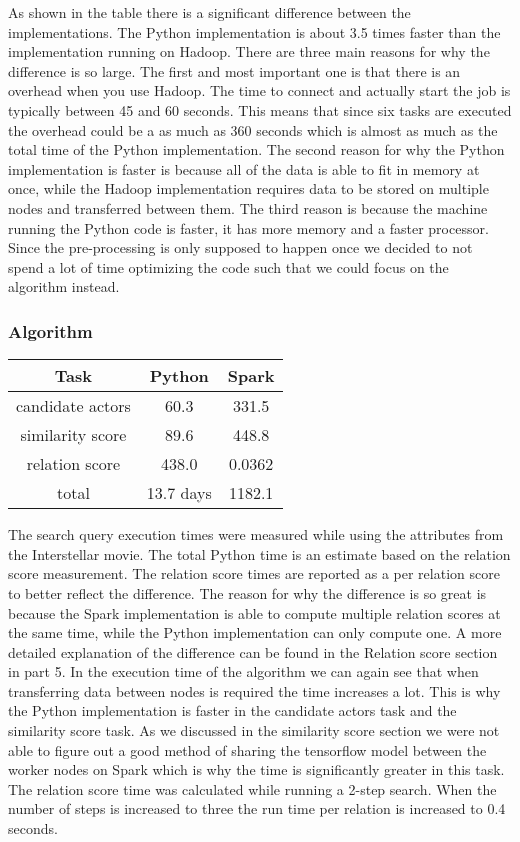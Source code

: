 As shown in the table there is a significant difference between the implementations. The Python implementation is about 3.5 times faster than the implementation running on Hadoop.  There are three main reasons for why the difference is so large. The first and most important one is that there is an overhead when you use Hadoop. The time to connect and actually start the job is typically between 45 and 60 seconds. This means that since six tasks are executed the overhead could be a as much as 360 seconds which is almost as much as the total time of the Python implementation. The second reason for why the Python implementation is faster is because all of the data is able to fit in memory at once, while the Hadoop implementation requires data to be stored on multiple nodes and transferred between them. The third reason is because the machine running the Python code is faster, it has more memory and a faster processor. Since the pre-processing is only supposed to happen once we decided to not spend a lot of time optimizing the code such that we could focus on the algorithm instead.

\subsubsection{Algorithm}
\begin{center}
    \begin{tabular}{ |c|c|c| } 
        \hline
        Task & Python & Spark \\ 
        \hline
        candidate actors & 60.3 & 331.5 \\ 
        similarity score & 89.6 & 448.8 \\ 
        relation score & 438.0 & 0.0362 \\ 
        total & 13.7 days & 1182.1 \\ 
        \hline
    \end{tabular}
\end{center}

The search query execution times were measured while using the attributes from the Interstellar movie. The total Python time is an estimate based on the relation score measurement. The relation score times are reported as a per relation score to better reflect the difference. The reason for why the difference is so great is because the Spark implementation is able to compute multiple relation scores at the same time, while the Python implementation can only compute one. A more detailed explanation of the difference can be found in the Relation score section in part 5. In the execution time of the algorithm we can again see that when transferring data between nodes is required the time increases a lot. This is why the Python implementation is faster in the candidate actors task and the similarity score task. As we discussed in the similarity score section we were not able to figure out a good method of sharing the tensorflow model between the worker nodes on Spark which is why the time is significantly greater in this task. The relation score time was calculated while running a 2-step search. When the number of steps is increased to three the run time per relation is increased to 0.4 seconds.

